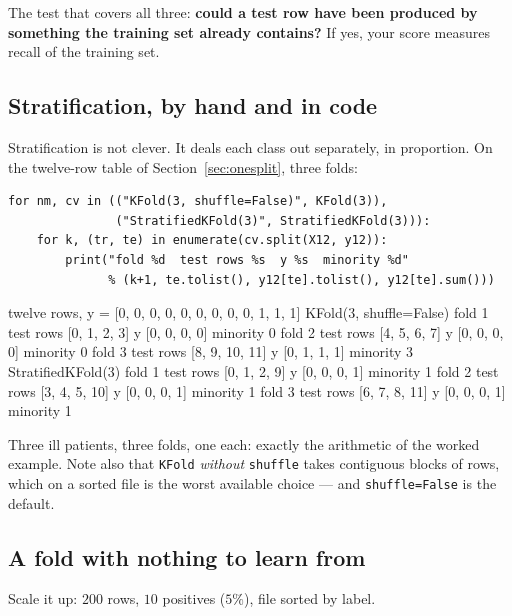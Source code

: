 \documentclass[11pt]{article}
\begin{document}
The test that covers all three: \textbf{could a test row have been produced by
something the training set already contains?} If yes, your score measures
recall of the training set.

\subsection{Stratification, by hand and in code}
\label{sec:stratify}

Stratification is not clever. It deals each class out separately, in
proportion. On the twelve-row table of Section~\ref{sec:onesplit}, three folds:

\begin{lstlisting}
for nm, cv in (("KFold(3, shuffle=False)", KFold(3)),
               ("StratifiedKFold(3)", StratifiedKFold(3))):
    for k, (tr, te) in enumerate(cv.split(X12, y12)):
        print("fold %d  test rows %s  y %s  minority %d"
              % (k+1, te.tolist(), y12[te].tolist(), y12[te].sum()))
\end{lstlisting}
\begin{codeout}
twelve rows, y = [0, 0, 0, 0, 0, 0, 0, 0, 0, 1, 1, 1]
   KFold(3, shuffle=False)
      fold 1  test rows [0, 1, 2, 3]    y [0, 0, 0, 0]  minority 0
      fold 2  test rows [4, 5, 6, 7]    y [0, 0, 0, 0]  minority 0
      fold 3  test rows [8, 9, 10, 11]  y [0, 1, 1, 1]  minority 3
   StratifiedKFold(3)
      fold 1  test rows [0, 1, 2, 9]    y [0, 0, 0, 1]  minority 1
      fold 2  test rows [3, 4, 5, 10]   y [0, 0, 0, 1]  minority 1
      fold 3  test rows [6, 7, 8, 11]   y [0, 0, 0, 1]  minority 1
\end{codeout}

Three ill patients, three folds, one each: exactly the arithmetic of the
worked example. Note also that \texttt{KFold} \emph{without} \texttt{shuffle}
takes contiguous blocks of rows, which on a sorted file is the worst available
choice --- and \texttt{shuffle=False} is the default.

\subsection{A fold with nothing to learn from}

Scale it up: $200$ rows, $10$ positives ($5\%$), file sorted by label.
\end{document}

